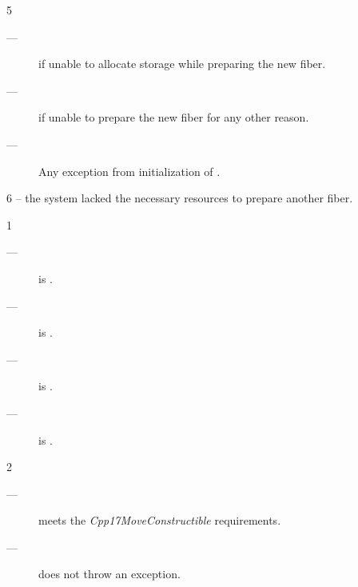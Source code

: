 5 \except
\begin{description}
    \item[---]  if unable to allocate storage while preparing
               the new fiber.
    \item[---]  if unable to prepare the new fiber for any
               other reason.
    \item[---] Any exception from initialization of .
\end{description}

6 \errors
{} -- the system lacked the necessary resources to prepare another fiber.


1 \mandates
\begin{description}
    \item[---]  is \true.
    \item[---]  is \true.
    \item[---]  is \true.
    \item[---]  is \true.
\end{description}

2 \precond
\begin{description}
    \item[---]  meets the \emph{Cpp17MoveConstructible} requirements.
    \item[---]  does not throw an exception.
\end{description}

